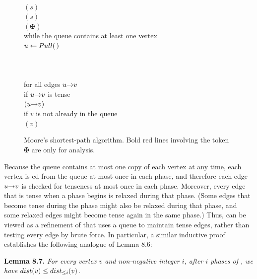 \begin{figure}[ht]
\centering
\begin{pseudocode}
\\
$(s)$\\
$(s)$\\
{\color{JEred}\bfseries{}$(\maltese)$} \\
while the queue contains at least one vertex\\
\Indent $u \gets Pull(\,)$\\
\\
\Indent{} \\
\\
\Indent\Indent for all edges $u\mathord{\rightarrow}v$\\
\Indent\Indent\Indent if $u\mathord{\rightarrow}v$ is tense\\
\Indent\Indent\Indent\Indent {}$(u\mathord{\rightarrow}v)$\\
\Indent\Indent\Indent\Indent if $v$ is not already in the queue\\
\Indent\Indent\Indent\Indent\Indent {}$(v)$
\end{pseudocode}
\caption{Moore’s shortest-path algorithm. Bold red lines involving the token $\maltese$ are only for analysis.}
\label{fig:8.16}
\end{figure}

Because the queue contains at most one copy of each vertex at any time, each vertex is ed from the queue at most once in each phase, and therefore each edge $u\mathord{\rightarrow}v$ is checked for tenseness at most once in each phase.
Moreover, every edge that is tense when a phase begins is relaxed during that phase.
(Some edges that become tense during the phase might also be relaxed during that phase, and some relaxed edges might become tense again in the same phase.)
Thus,  can be viewed as a refinement of  that uses a queue to maintain tense edges, rather than testing every edge by brute force.
In particular, a similar inductive proof establishes the following analogue of Lemma 8.6:

\textbf{Lemma 8.7.} \textsl{For every vertex $v$ and non-negative integer $i$, after $i$ phases of , we have $dist(v) \le dist_{\le i}(v)$.}

